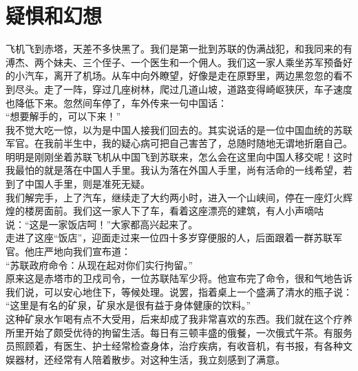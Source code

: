 \fancyhead[RO]{} %
\fancyhead[LE]{} %
\chapter*{疑惧和幻想}
\thispagestyle{empty}
飞机飞到赤塔，天差不多快黑了。我们是第一批到苏联的伪满战犯，和我同来的有溥杰、两个妹夫、三个侄子、一个医生和一个佣人。我们这一家人乘坐苏军预备好的小汽车，离开了机场。从车中向外瞭望，好像是走在原野里，两边黑忽忽的看不到尽头。走了一阵，穿过几座树林，爬过几道山坡，道路变得崎岖狭厌，车子速度也降低下来。忽然间车停了，车外传来一句中国话：\\

“想要解手的，可以下来！”\\

我不觉大吃一惊，以为是中国人接我们回去的。其实说话的是一位中国血统的苏联军官。在我前半生中，我的疑心病可把自己害苦了，总随时随地无谓地折磨自己。明明是刚刚坐着苏联飞机从中国飞到苏联来，怎么会在这里向中国人移交呢！这时我最怕的就是落在中国人手里。我认为落在外国人手里，尚有活命的一线希望，若到了中国人手里，则是准死无疑。\\

我们解完手，上了汽车，继续走了大约两小时，进入一个山峡间，停在一座灯火辉煌的楼房面前。我们这一家人下了车，看着这座漂亮的建筑，有人小声嘀咕说：“这是一家饭店呵！”大家都高兴起来了。\\

走进了这座“饭店”，迎面走过来一位四十多岁穿便服的人，后面跟着一群苏联军官。他庄严地向我们宣布道：\\

“苏联政府命令：从现在起对你们实行拘留。”\\

原来这是赤塔市的卫戍司令，一位苏联陆军少将。他宣布完了命令，很和气地告诉我们说，可以安心地住下，等候处理。说罢，指着桌上一个盛满了清水的瓶子说：\\

“这里是有名的矿泉，矿泉水是很有益于身体健康的饮料。”\\

这种矿泉水乍喝有点不大受用，后来却成了我非常喜欢的东西。我们就在这个疗养所里开始了颇受优待的拘留生活。每日有三顿丰盛的俄餐，一次俄式午茶。有服务员照顾着，有医生、护士经常检查身体，治疗疾病，有收音机，有书报，有各种文娱器材，还经常有人陪着散步。对这种生活，我立刻感到了满意。\\

